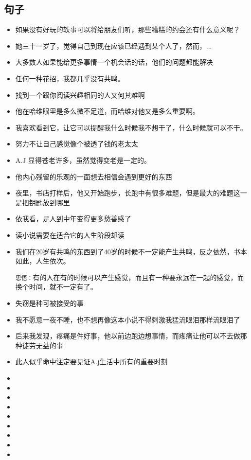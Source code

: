\documentclass[UTF8,a4paper,8pt]{ctexbook}
\begin{document}
		\subsection{句子}
			\begin{itemize}
				\item 如果没有好玩的轶事可以将给朋友们听，那些糟糕的约会还有什么意义呢？ 
				\item 她三十一岁了，觉得自己到现在应该已经遇到某个人了，然而，...
				\item 大多数人如果能给更多事情一个机会话的话，他们的问题都能解决
				\item 任何一种花招，我都几乎没有共鸣。
				\item 找到一个跟你阅读兴趣相同的人又何其难啊
				\item 他在哈维眼里是多么微不足道，而哈维对他又是多么重要啊。
				\item 我喜欢看到它，让它可以提醒我什么时候我不想干了，什么时候就可以不干。
				\item 努力不让自己感觉像个被透了钱的老太太
				\item A.J 显得苍老许多，虽然觉得变老是一定的。
				\item 他内心残留的乐观的一面想去相信会遇到更好的东西
				\item 夜里，书店打样后，他又开始跑步，长跑中有很多难题，但是最大的难题这一是把钥匙放到哪里 
				\item 依我看，是人到中年变得更多愁善感了  
				\item 读小说需要在适合它的人生阶段却读
				\item 我们在20岁有共鸣的东西到了40岁的时候不一定能产生共鸣，反之依然，书本如此，人生依次。
				
				\verb|思悟：|有的人在有的时候可以产生感觉，而且有一种要永远在一起的感觉，而换个时间，就不一定有了。
				
				\item 失窃是种可被接受的事
				\item 我不愿意一夜不睡，也不想再像这本小说不得刺激我猛流眼泪那样流眼泪了
				\item 后来我发现，疼痛是件好事，他以前边跑边想事情，而疼痛让他可以不去做那种徒劳无益的事
				\item 此人似乎命中注定要见证A.j生活中所有的重要时刻
				\item 
				\item 
				\item 
				\item 
				\item 
				\item 
				\item 
				\item 
				\item 
			\end{itemize}
	
\end{document}
